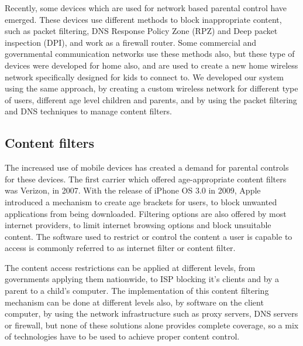 Recently, some devices which are used for network based parental control have emerged. These devices use different methods to block inappropriate content, such as packet filtering, DNS Response Policy Zone (RPZ) and Deep packet inspection (DPI), and work as a firewall router. Some commercial and governmental communication networks use these methods also, but these type of devices were developed for home also, and are used to create a new home wireless network specifically designed for kids to connect to. We developed our system using the same approach, by creating a custom wireless network for different type of users, different age level children and parents, and by using the packet filtering and DNS techniques to manage content filters.

\subsection{Content filters}

The increased use of mobile devices has created a demand for parental controls for these devices. The first carrier which offered age-appropriate content filters was Verizon, in 2007. With the release of iPhone OS 3.0 in 2009, Apple introduced a mechanism to create age brackets for users, to block unwanted applications from being downloaded. Filtering options are also offered by most internet providers, to limit internet browsing options and block unsuitable content. The software used to restrict or control the content a user is capable to access is commonly referred to as internet filter or content filter.

The content access restrictions can be applied at different levels, from governments applying them nationwide, to ISP blocking it's clients and by a parent to a child's computer. The implementation of this content filtering mechanism can be done at different levels also, by software on the client computer, by using the network infrastructure such as proxy servers, DNS servers or firewall, but none of these solutions alone provides complete coverage, so a mix of technologies have to be used to achieve proper content control.

